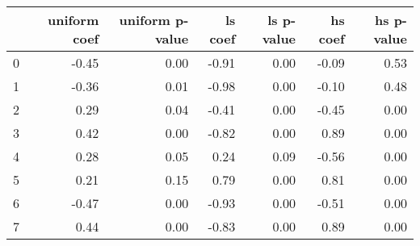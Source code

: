 \begin{tabular}{lrrrrrr}
\toprule
 & uniform coef & uniform p-value & ls coef & ls p-value & hs coef & hs p-value \\
\midrule
0 & -0.45 & 0.00 & -0.91 & 0.00 & -0.09 & 0.53 \\
1 & -0.36 & 0.01 & -0.98 & 0.00 & -0.10 & 0.48 \\
2 & 0.29 & 0.04 & -0.41 & 0.00 & -0.45 & 0.00 \\
3 & 0.42 & 0.00 & -0.82 & 0.00 & 0.89 & 0.00 \\
4 & 0.28 & 0.05 & 0.24 & 0.09 & -0.56 & 0.00 \\
5 & 0.21 & 0.15 & 0.79 & 0.00 & 0.81 & 0.00 \\
6 & -0.47 & 0.00 & -0.93 & 0.00 & -0.51 & 0.00 \\
7 & 0.44 & 0.00 & -0.83 & 0.00 & 0.89 & 0.00 \\
\bottomrule
\end{tabular}
